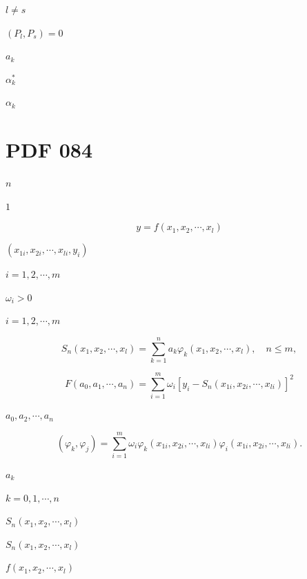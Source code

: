 \documentclass[UTF8,fontset=fandol,a4paper]{ctexart}
\begin{document}
\noindent $l\ne s$\par

\noindent $(P_l,P_s)=0$\par

\noindent $a_k$\par

\noindent $\alpha_k^*$\par

\noindent $\alpha_k$\par

\section*{PDF 084}

\noindent $n$\par

\noindent $1$\par

\[
y=f(x_1,x_2,\cdots,x_l)
\]

\noindent $(x_{1i},x_{2i},\cdots,x_{li},y_i)$\par

\noindent $i=1,2,\cdots,m$\par

\noindent $\omega_i>0$\par

\noindent $i=1,2,\cdots,m$\par

\[
S_n(x_1,x_2,\cdots,x_l)=\sum_{k=1}^na_k\varphi_k(x_1,x_2,\cdots,x_l),\quad n\leqslant m,
\]

\[
F(a_0,a_1,\cdots,a_n)=\sum_{i=1}^m\omega_i[y_i-S_n(x_{1i},x_{2i},\cdots,x_{li})]^2
\]

\noindent $a_0,a_2,\cdots,a_n$\par

\[
(\varphi_k,\varphi_j)=\sum_{i=1}^m\omega_i\varphi_k(x_{1i},x_{2i},\cdots,x_{li})\varphi_i(x_{1i},x_{2i},\cdots,x_{li}).
\]

\noindent $a_k$\par

\noindent $k=0,1,\cdots,n$\par

\noindent $S_n(x_1,x_2,\cdots,x_l)$\par

\noindent $S_n(x_1,x_2,\cdots,x_l)$\par

\noindent $f(x_1,x_2,\cdots,x_l)$\par
\end{document}
